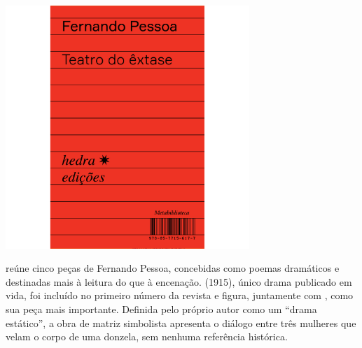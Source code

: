 \vfill

\hspace*{-.4cm}\begin{minipage}[c]{.5\linewidth}
\small{
{}}
\end{minipage}

\pagebreak

\begin{center}
\hspace*{.5cm}\includegraphics[width=92mm]{./grid/pessoa.jpg}
\end{center}

\hspace*{-7cm}\hrulefill\hspace*{-7cm}

\medskip

 reúne cinco peças de Fernando Pessoa, concebidas 
como poemas dramáticos e destinadas mais à leitura do que à encenação. 
{} (1915), único drama publicado em vida, foi incluído no
primeiro número da revista {} e figura, juntamente com
{}, como sua peça mais importante.  Definida pelo próprio autor
como um ``drama estático'', a obra de matriz simbolista apresenta o diálogo
entre três mulheres que velam o corpo de uma donzela, sem nenhuma referência
histórica.

